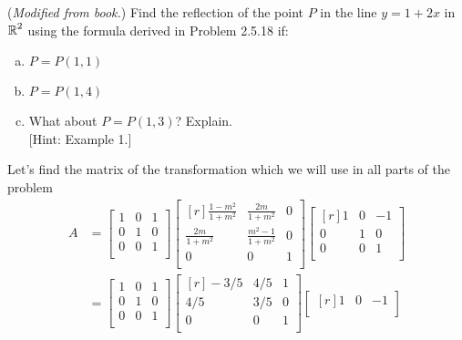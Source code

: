 \documentclass[../main.tex]{subfiles}
\begin{document}
(\emph{Modified from book.})
Find the reflection of the point $P$ in the line $y = 1 + 2x$ in $\operatorname{\mathbb{R}}^2$ using the formula derived in Problem 2.5.18 if:
\begin{enumerate}[a)]
	\item $P = P(1, 1)$
	\item $P = P(1, 4)$
	\item What about $P = P(1, 3)$? Explain. \\
	\hspace{0pt}[Hint: Example 1.]  %
\end{enumerate}

\solution
Let's find the matrix of the transformation which we will use in all parts of the problem
		\begin{align*}
			A
			&=
			\begin{bmatrix}
				1 & 0 & 1 \\
				0 & 1 & 0 \\
				0 & 0 & 1 \\
			\end{bmatrix}
			\begin{bmatrix*}[r]
				\frac{1-m^2}{1+m^2} &  \frac{2m}{1+m^2} & 0 \\
				\frac{2m}{1+m^2} & \frac{m^2-1}{1+m^2} & 0 \\
				0 & 0 & 1 \\
			\end{bmatrix*}
			\begin{bmatrix*}[r]
				1 & 0 & -1 \\
				0 & 1 & 0 \\
				0 & 0 & 1 \\
			\end{bmatrix*}
			\\&=
			\begin{bmatrix}
				1 & 0 & 1 \\
				0 & 1 & 0 \\
				0 & 0 & 1 \\
			\end{bmatrix}
			\begin{bmatrix*}[r]
				-3/5 & 4/5 & 1 \\
				4/5 & 3/5 & 0 \\
				0 & 0 & 1 \\
			\end{bmatrix*}
			\begin{bmatrix*}[r]
				1 & 0 & -1 \\

\end{bmatrix*}
\end{align*}
\end{document}
